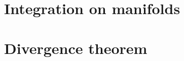\documentclass{wongtreebook}
\begin{document}


\chapter{Integration on manifolds}



\chapter{Divergence theorem}


\end{document}
